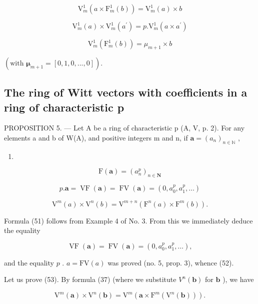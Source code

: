 \[
\mathrm{V} _ {m} ^ {1} (a \times \mathrm{F} _ {m} ^ {1} (b)) = \mathrm{V} _ {m} ^ {1} (a) \times b\tag{49}
\]

\[
\mathrm{V} _ {m} ^ {1} (a) \times \mathrm{V} _ {m} ^ {1} (a ^ {\prime}) = p. \mathrm{V} _ {m} ^ {1} (a \times a ^ {\prime})\tag{50}
\]

\[
\mathrm{V} _ {m} ^ {1} (\mathrm{F} _ {m} ^ {1} (b)) = \mu_ {m + 1} \times b
\]

\((\text{with } \boldsymbol{\mu}_{m+1} = [0, 1, 0, ..., 0]).\)

\subsection{The ring of Witt vectors with coefficients in a ring of characteristic p}

PROPOSITION 5. --- Let A be a ring of characteristic p (A, V, p. 2). For any elements a and b of W(A), and positive integers m and n, if \(\boldsymbol{a} = (a_{n})_{n \in \mathbb{N}}\) ,

\begin{enumerate}
\def\labelenumi{(\arabic{enumi})}
\setcounter{enumi}{50}
\tightlist
\item
\end{enumerate}

\[
\mathrm{F} (\boldsymbol {a}) = (a _ {n} ^ {p}) _ {n \in \mathbf {N}}\tag{52}
\]

\[
p. \boldsymbol {a} = \operatorname{VF} (\boldsymbol {a}) = \operatorname{FV} (\boldsymbol {a}) = (0, a _ {0} ^ {p}, a _ {1} ^ {p}, \dots)\tag{53}
\]

\[
\mathrm{V} ^ {m} (a) \times \mathrm{V} ^ {n} (b) = \mathrm{V} ^ {m + n} (\mathrm{F} ^ {n} (a) \times \mathrm{F} ^ {m} (b)).
\]

Formula (51) follows from Example 4 of No. 3. From this we immediately deduce the equality

\[
\operatorname{VF} (\boldsymbol {a}) = \operatorname{FV} (\boldsymbol {a}) = (0, a _ {0} ^ {p}, a _ {1} ^ {p}, \dots),
\]

and the equality \(p\) . \(a = \text{FV}(a)\) was proved (no. 5, prop. 3), whence (52).

Let us prove (53). By formula (37) (where we substitute \(V^n(\boldsymbol{b})\) for \(\boldsymbol{b}\) ), we have

\[
\mathrm{V} ^ {m} (\boldsymbol {a}) \times \mathrm{V} ^ {n} (\boldsymbol {b}) = \mathrm{V} ^ {m} \left(\boldsymbol {a} \times \mathrm{F} ^ {m} \left(\mathrm{V} ^ {n} (\boldsymbol {b})\right)\right).\tag{54}
\]

